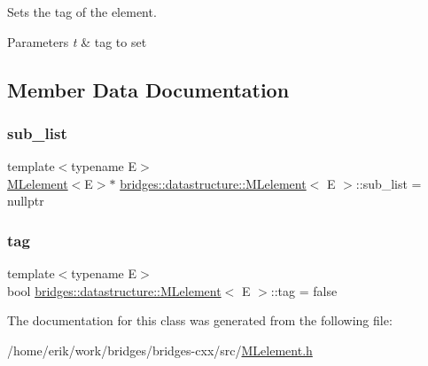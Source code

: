 Sets the tag of the element. 


\begin{DoxyParams}{Parameters}
{\em t} & tag to set \\
\hline
\end{DoxyParams}


\subsection{Member Data Documentation}
\mbox{\label{classbridges_1_1datastructure_1_1_m_lelement_afe31ff363c0861efb8eacc12f2a651df}} 
\subsubsection{\texorpdfstring{sub\+\_\+list}{sub\_list}}
{\footnotesize\ttfamily template$<$typename E$>$ \\
\hyperlink{classbridges_1_1datastructure_1_1_m_lelement}{M\+Lelement}$<$E$>$$\ast$ \hyperlink{classbridges_1_1datastructure_1_1_m_lelement}{bridges\+::datastructure\+::\+M\+Lelement}$<$ E $>$\+::sub\+\_\+list = nullptr\hspace{0.3cm}{\ttfamily [protected]}}

\mbox{\label{classbridges_1_1datastructure_1_1_m_lelement_aef061a364a85ebb0c0f2cdaff8c726e6}} 
\subsubsection{\texorpdfstring{tag}{tag}}
{\footnotesize\ttfamily template$<$typename E$>$ \\
bool \hyperlink{classbridges_1_1datastructure_1_1_m_lelement}{bridges\+::datastructure\+::\+M\+Lelement}$<$ E $>$\+::tag = false\hspace{0.3cm}{\ttfamily [protected]}}



The documentation for this class was generated from the following file\+:\begin{DoxyCompactItemize}
\item 
/home/erik/work/bridges/bridges-\/cxx/src/\hyperlink{_m_lelement_8h}{M\+Lelement.\+h}\end{DoxyCompactItemize}
